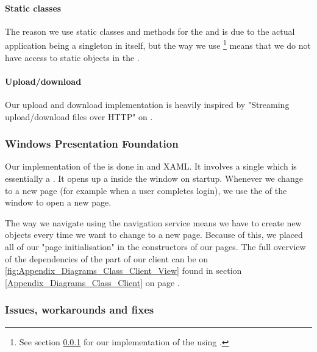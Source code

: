 \paragraph{Static classes}
The reason we use static classes and methods for the  and  is due to the actual application being a singleton in itself, but the way we use \footnote{See section \ref{Implementation_Client_Architecture_WPF} for our implementation of the  using .} means that we do not have access to static objects in the .

\paragraph{Upload/download} Our upload and download implementation is heavily inspired by "Streaming upload/download files over HTTP" on \cite{CODE:UPLDL}. 

\subsubsection{Windows Presentation Foundation}
\label{Implementation_Client_Architecture_WPF}
Our implementation of the  is done in  and XAML. It involves a single  which is essentially a  . It opens up a  inside the window on startup. Whenever we change to a new page (for example when a user completes login), we use the  of the window to open a new page.

The way we navigate using the navigation service means we have to create new  objects every time we want to change to a new page. Because of this, we placed all of our "page initialisation" in the constructors of our pages. The full overview of the dependencies of the  part of our client can be on \ref{fig:Appendix_Diagrams_Class_Client_View} found in section \ref{Appendix_Diagrams_Class_Client} on page \pageref{Appendix_Diagrams_Class_Client}.

\subsubsection{Issues, workarounds and fixes}
\label{Implementation_Client_Architecture_Issues}


